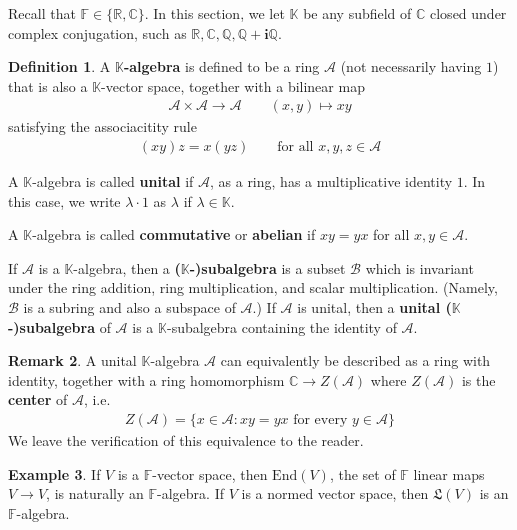 \documentclass[12pt,b5paper,notitlepage]{article}
\theoremstyle{definition}
\newtheorem{df}{Definition}[subsection]
\newtheorem{eg}[df]{Example}
\newtheorem{rem}[df]{Remark}
\theoremstyle{plain}
\newcommand{\fk}{\mathfrak}
\newcommand{\End}{\mathrm{End}} %
\newcommand{\scr}{\mathscr}
\newcommand{\im}{\mathbf{i}}
\newcommand{\Kbb}{\mathbb K}
\newcommand{\Cbb}{\mathbb C}
\newcommand{\Qbb}{\mathbb Q}
\newcommand{\Rbb}{\mathbb R}
\newcommand{\Fbb}{\mathbb F}
\numberwithin{equation}{section}
\begin{document}
Recall that $\Fbb\in\{\Rbb,\Cbb\}$. In this section, we let $\Kbb$ be any subfield of $\Cbb$ closed under complex conjugation, such as $\Rbb,\Cbb,\Qbb,\Qbb+\im\Qbb$.


\begin{df}
A \textbf{$\Kbb$-algebra}   is defined to be a ring $\scr A$ (not necessarily having $1$) that is also a $\Kbb$-vector space, together with a bilinear map
\begin{align*}
\scr A\times\scr A\rightarrow\scr A\qquad (x,y)\mapsto xy
\end{align*}
satisfying the associacitity rule
\begin{align*}
(xy)z=x(yz)\qquad\text{for all }x,y,z\in \scr A
\end{align*}

A $\Kbb$-algebra is called \textbf{unital}  if $\scr A$, as a ring, has a multiplicative identity $1$. In this case, we write $\lambda\cdot 1$ as $\lambda$ if $\lambda\in\Kbb$. 

A $\Kbb$-algebra is called \textbf{commutative} or \textbf{abelian}   if $xy=yx$ for all $x,y\in\scr A$.

If $\scr A$ is a $\Kbb$-algebra, then a \textbf{($\Kbb$-)subalgebra}  is a subset $\scr B$ which is invariant under the ring addition, ring multiplication, and scalar multiplication. (Namely, $\scr B$ is a subring and also a subspace of $\scr A$.) If $\scr A$ is unital, then a \textbf{unital ($\Kbb$-)subalgebra} of $\scr A$ is a $\Kbb$-subalgebra containing the identity of $\scr A$.  \hfill\qedsymbol
\end{df}


\begin{rem}
A unital $\Kbb$-algebra $\scr A$ can equivalently be described as a ring with identity, together with a ring homomorphism $\Cbb\rightarrow Z(\scr A)$ where $Z(\scr A)$ is the \textbf{center} of $\scr A$, i.e.
\begin{align*}
Z(\scr A)=\{x\in\scr A:xy=yx\text{ for every }y\in\scr A\}
\end{align*}
We leave the verification of this equivalence to the reader.
\end{rem}



\begin{eg}
If $V$ is a $\Fbb$-vector space, then $\End(V)$, the set of $\Fbb$ linear maps $V\rightarrow V$, is naturally an $\Fbb$-algebra. If $V$ is a normed vector space, then $\fk L(V)$ is an $\Fbb$-algebra.
\end{eg}
\end{document}
